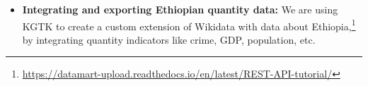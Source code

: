 \documentclass[runningheads]{llncs}
\newcommand{\kibitz}[2]{%
{\color{#1}#2}{}%
}
\newcommand{\filip}[1]{\kibitz{purple}{[FI:#1]}} %
\newcommand{\pedro}[1]{\kibitz{orange}{[PS: #1]}} %
\newcommand{\DG}[1]{\kibitz{red}{[DG: #1]}} %
\begin{document}
\begin{itemize}

\item \textbf{Integrating and exporting Ethiopian quantity data:}
We are using KGTK to create a custom extension of Wikidata with data about Ethiopia,\footnote{\url{https://datamart-upload.readthedocs.io/en/latest/REST-API-tutorial/}} by integrating quantity indicators like crime, GDP, population, etc.%
\end{itemize}


\end{document}
